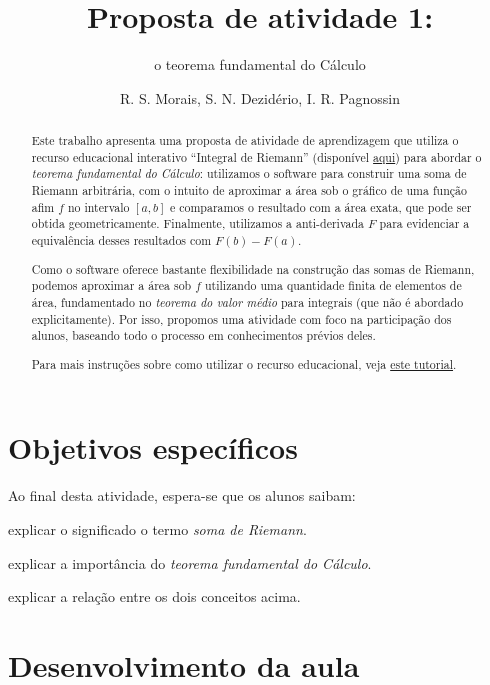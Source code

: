 \documentclass[a4paper,12pt]{scrartcl}
\title{Proposta de atividade 1:}
\subtitle{o teorema fundamental do Cálculo}
\author{R. S. Morais, S. N. Dezidério, I. R. Pagnossin}
\begin{document}
  \setlength\parindent{2em}

  \maketitle

  \begin{abstract}
    Este trabalho apresenta uma proposta de atividade de aprendizagem que utiliza o recurso educacional interativo ``Integral de Riemann'' (disponível \href{http://cepa-usp.github.io/AI-0170/}{aqui}) para abordar o \emph{teorema fundamental do Cálculo}: utilizamos o software para construir uma soma de Riemann arbitrária, com o intuito de aproximar a área sob o gráfico de uma função afim $f$ no intervalo $[a,b]$ e comparamos o resultado com a área exata, que pode ser obtida geometricamente. Finalmente, utilizamos a anti-derivada $F$ para evidenciar a equivalência desses resultados com $F(b) - F(a)$.
    
    Como o software oferece bastante flexibilidade na construção das somas de Riemann, podemos aproximar a área sob $f$ utilizando uma quantidade finita de elementos de área, fundamentado no \emph{teorema do valor médio} para integrais (que não é abordado explicitamente). Por isso, propomos uma atividade com foco na participação dos alunos, baseando todo o processo em conhecimentos prévios deles.
    
    Para mais instruções sobre como utilizar o recurso educacional, veja \href{http://www.youtube.com/watch?v=PJlPleMYuG4&t=22}{este tutorial}.
  \end{abstract}
  
  \section*{Objetivos específicos}
  
    Ao final desta atividade, espera-se que os alunos saibam:
    \begin{compactitem}
      \item explicar o significado o termo \emph{soma de Riemann}.
      \item explicar a importância do \emph{teorema fundamental do Cálculo}.
      \item explicar a relação entre os dois conceitos acima.
    \end{compactitem}

  \section*{Desenvolvimento da aula}
  
\end{document}
